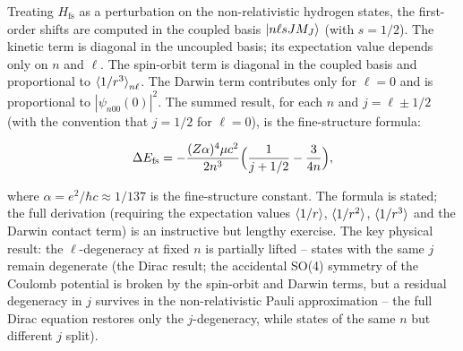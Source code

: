 Treating $H_{\text{fs}}$ as a perturbation on the non-relativistic hydrogen states, the first-order shifts are computed in the coupled basis $\ket{n\ell s JM_{J}}$ (with $s=1/2$). The kinetic term is diagonal in the uncoupled basis; its expectation value depends only on $n$ and $\ell$. The spin-orbit term is diagonal in the coupled basis and proportional to $\braket{1/r^{3}}_{n\ell}$. The Darwin term contributes only for $\ell=0$ and is proportional to $|\psi_{n00}(0)|^{2}$. The summed result, for each $n$ and $j = \ell \pm 1/2$ (with the convention that $j=1/2$ for $\ell=0$), is the fine-structure formula:
\begin{linenomath}
\begin{equation*}
\Delta E_{\text{fs}} = -\frac{(Z\alpha)^{4}\mu c^{2}}{2n^{3}}\Bigl(\frac{1}{j+1/2} - \frac{3}{4n}\Bigr),
\end{equation*}
\end{linenomath}
where $\alpha = e^{2}/\hbar c \approx 1/137$ is the fine-structure constant. The formula is stated; the full derivation (requiring the expectation values $\braket{1/r}$, $\braket{1/r^{2}}$, $\braket{1/r^{3}}$ and the Darwin contact term) is an instructive but lengthy exercise. The key physical result: the $\ell$-degeneracy at fixed $n$ is partially lifted -- states with the same $j$ remain degenerate (the Dirac result; the accidental SO(4) symmetry of the Coulomb potential is broken by the spin-orbit and Darwin terms, but a residual degeneracy in $j$ survives in the non-relativistic Pauli approximation -- the full Dirac equation restores only the $j$-degeneracy, while states of the same $n$ but different $j$ split).


